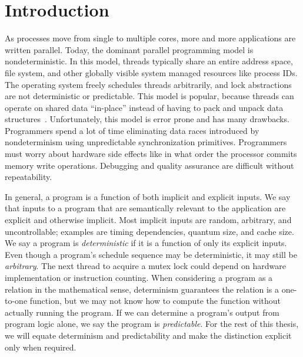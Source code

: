 
\section{Introduction}
As processes move from single to multiple cores, more and more applications are
written parallel. Today, the dominant parallel programming model is
nondeterministic. In this model, threads typically share an entire address
space, file system, and other globally visible system managed resources like
process IDs. The operating system freely schedules threads arbitrarily, and
lock abstractions are not deterministic or predictable. This model is popular,
because threads can operate on shared data ``in-place'' instead of having to
pack and unpack data structures~\cite{Aviram10}. Unfortunately, this model is
error prone and has many drawbacks. Programmers spend a lot of time eliminating
data races introduced by nondeterminism using unpredictable synchronization
primitives. Programmers must worry about hardware side effects like in what
order the processor commits memory write operations. Debugging and quality
assurance are difficult without repeatability.

\iffalse
# The state of parallel programming and nondeterminism
* As processes move from single to multiple cores, more and more applications
  are written parallel.
* Today, the dominant parallel programming model is nondeterministic. In this
  model:
* Threads share address space, file system, and other globally visible
  resources and
* The OS is free to schedule threads arbitrarily and lock abstractions are not
  deterministic or predictable.
* This model is popular despite drawbacks:
* Data races and lock abstractions introduce bugs and deadlock,
* Programmers spend a lot of time eliminating nondeterminism (data races) using
  unpredictable synchronization primitives,
* Programmers must worry about hardware side effects like ordering of committing
  memory operations,
* Debugging and quality assurance are difficult without repeatability.
\fi

In general, a program is a function of both implicit and explicit inputs.
We say that inputs to a program that are semantically relevant to the
application are explicit and otherwise implicit. Most implicit inputs are
random, arbitrary, and uncontrollable; examples are timing dependencies, quantum
size, and cache size. We say a program is \emph{deterministic} if it is
a function of only its explicit inputs. Even though a program's schedule
sequence may be deterministic, it may still be \emph{arbitrary}. The next
thread to acquire a mutex lock could depend on hardware implementation or
instruction counting. When considering a program as a relation in the
mathematical sense, determinism guarantees the relation is a one-to-one
function, but we may not know how to compute the function without actually
running the program. If we can determine a program's output from program logic
alone, we say the program is \emph{predictable}. For the rest of this thesis,
we will equate determinism and predictability and make the distinction explicit
only when required.

